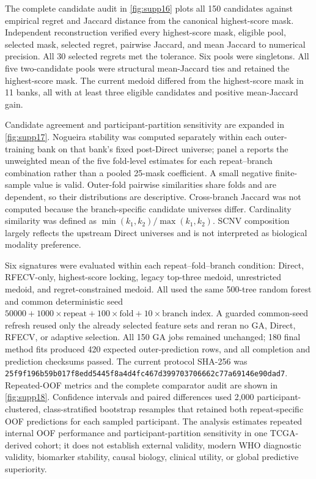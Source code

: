 The complete candidate audit in \cref{fig:supp16} plots all 150 candidates against empirical regret and Jaccard distance from the canonical highest-score mask. Independent reconstruction verified every highest-score mask, eligible pool, selected mask, selected regret, pairwise Jaccard, and mean Jaccard to numerical precision. All 30 selected regrets met the tolerance. Six pools were singletons. All five two-candidate pools were structural mean-Jaccard ties and retained the highest-score mask. The current medoid differed from the highest-score mask in 11 banks, all with at least three eligible candidates and positive mean-Jaccard gain.

Candidate agreement and participant-partition sensitivity are expanded in \cref{fig:supp17}. Nogueira stability was computed separately within each outer-training bank on that bank's fixed post-Direct universe; panel a reports the unweighted mean of the five fold-level estimates for each repeat--branch combination rather than a pooled 25-mask coefficient. A small negative finite-sample value is valid. Outer-fold pairwise similarities share folds and are dependent, so their distributions are descriptive. Cross-branch Jaccard was not computed because the branch-specific candidate universes differ. Cardinality similarity was defined as \(\min(k_1,k_2)/\max(k_1,k_2)\). SCNV composition largely reflects the upstream Direct universes and is not interpreted as biological modality preference.

Six signatures were evaluated within each repeat--fold--branch condition: Direct, RFECV-only, highest-score locking, legacy top-three medoid, unrestricted medoid, and regret-constrained medoid. All used the same 500-tree random forest and common deterministic seed \(50000 + 1000\times\text{repeat} + 100\times\text{fold} + 10\times\text{branch index}\). A guarded common-seed refresh reused only the already selected feature sets and reran no GA, Direct, RFECV, or adaptive selection. All 150 GA jobs remained unchanged; 180 final method fits produced 420 expected outer-prediction rows, and all completion and prediction checksums passed. The current protocol SHA-256 was \texttt{25f9f196b59b017f8edd5445f8a4d4fc467d399703706662c77a69146e90dad7}. Repeated-OOF metrics and the complete comparator audit are shown in \cref{fig:supp18}. Confidence intervals and paired differences used 2,000 participant-clustered, class-stratified bootstrap resamples that retained both repeat-specific OOF predictions for each sampled participant. The analysis estimates repeated internal OOF performance and participant-partition sensitivity in one TCGA-derived cohort; it does not establish external validity, modern WHO diagnostic validity, biomarker stability, causal biology, clinical utility, or global predictive superiority.

